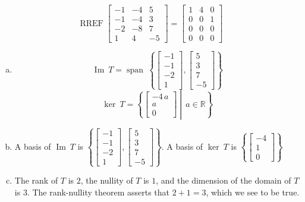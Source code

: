 \begin{exerciseAnswer} 


\[\operatorname{RREF} \left[\begin{array}{ccc}
-1 & -4 & 5 \\
-1 & -4 & 3 \\
-2 & -8 & 7 \\
1 & 4 & -5
\end{array}\right] = \left[\begin{array}{ccc}
1 & 4 & 0 \\
0 & 0 & 1 \\
0 & 0 & 0 \\
0 & 0 & 0
\end{array}\right] \]


\begin{enumerate}[(a)]
\item \[\operatorname{Im}\ T = \operatorname{span}\  \left\{ \left[\begin{array}{c}
-1 \\
-1 \\
-2 \\
1
\end{array}\right] , \left[\begin{array}{c}
5 \\
3 \\
7 \\
-5
\end{array}\right] \right\} \]\[\operatorname{ker}\ T =  \left\{ \left[\begin{array}{c}
-4 \, a \\
a \\
0
\end{array}\right] \middle|\,a\in\mathbb{R}\right\} \]
\item  A basis of \(\operatorname{Im}\ T\) is \( \left\{ \left[\begin{array}{c}
-1 \\
-1 \\
-2 \\
1
\end{array}\right] , \left[\begin{array}{c}
5 \\
3 \\
7 \\
-5
\end{array}\right] \right\} \). A basis of \(\operatorname{ker}\ T\) is \( \left\{ \left[\begin{array}{c}
-4 \\
1 \\
0
\end{array}\right] \right\} \)
\item  The rank of \(T\) is \( 2 \), the nullity of \(T\) is \( 1 \), and the dimension of the domain of \(T\) is \( 3 \). The rank-nullity theorem asserts that \( 2 + 1 = 3 \), which we see to be true. 
\end{enumerate}
    
\end{exerciseAnswer}
    
